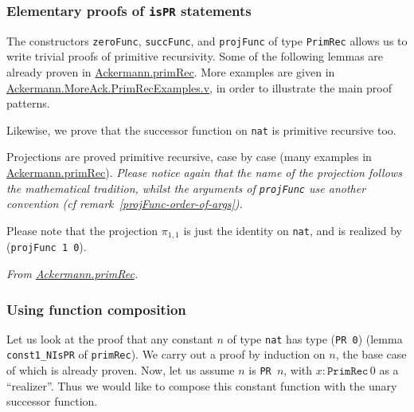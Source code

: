 \subsubsection{Elementary proofs of \texttt{isPR} statements}

The constructors \texttt{zeroFunc}, \texttt{succFunc},  and \texttt{projFunc} of type
\texttt{PrimRec} allows us to write trivial proofs of primitive recursivity. 
Some of   the following lemmas are already proven in 
\href{../theories/html/hydras.Ackermann.primRec.html}{Ackermann.primRec}. More examples are given in 
\href{../theories/html/hydras.MoreAck.PrimRecExamples.html}%
{Ackermann.MoreAck.PrimRecExamples.v}, in order to illustrate the main proof patterns.




Likewise, we prove that the successor function on \texttt{nat} is primitive recursive too.





Projections are proved primitive recursive, case by case (many examples in 
\href{../theories/html/hydras.Ackermann.primRec.html}{Ackermann.primRec}).
\emph{Please notice again that the name of the projection follows the mathematical tradition, 
whilst the arguments of  \texttt{projFunc} use another convention (\emph{cf} remark~\vref{projFunc-order-of-args}).}






Please note that the projection $\pi_{1,1}$ is just the identity on \texttt{nat}, and is realized by 
(\texttt{projFunc 1 0}).


\vspace{4pt}
\noindent
\emph{From \href{../theories/html/hydras.Ackermann.primRec.html}{Ackermann.primRec}.}



\subsubsection{Using function composition}

Let us look at the proof that any constant $n$ of type \texttt{nat} has type (\texttt{PR 0})
(lemma  \texttt{const1\_NIsPR} of \texttt{primRec}). We carry out a proof by induction on $n$, the base case of which is already proven.
Now, let us assume $n$ is \texttt{PR $n$}, with $x:\texttt{PrimRec}\,0$ as a ``realizer''.
Thus we would like to compose this constant function with the unary successor function.

